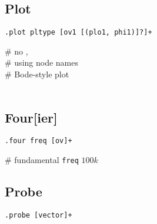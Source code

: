 \subsection*{Plot}
\begin{lstlisting}
.plot pltype [ov1 [(plo1, phi1)]?]+
\end{lstlisting}
 \# {\scriptsize no , }\\
 \# {\scriptsize using node names}\\
 \# {\scriptsize Bode-style plot}\\
  {\scriptsize }\\[1mm]

\subsection*{Four[ier]}
\begin{lstlisting}
.four freq [ov]+
\end{lstlisting}
 \# {\scriptsize  fundamental \texttt{freq} $100k$}\\[1mm]

\subsection*{Probe}
\begin{lstlisting}
.probe [vector]+
\end{lstlisting}
 \\[1mm]

